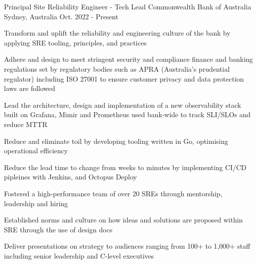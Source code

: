 

\begin{cventries}
  \cventry
    {Principal Site Reliability Engineer - Tech Lead} %
    {Commonwealth Bank of Australia} %
    {Sydney, Australia} %
    {Oct. 2022 - Present} %
    {
      \begin{cvitems} %
      \item {Transform and uplift the reliability and engineering culture of the bank by applying SRE tooling, principles, and practices} 
      \item {Adhere and design to meet stringent security and compliance finance and banking regulations set by regulatory bodies such as APRA (Australia's prudential regulator) including ISO 27001 to ensure customer privacy and data protection laws are followed}
      \item {Lead the architecture, design and implementation of a new observability stack built on Grafana, Mimir and Prometheus used bank-wide to track SLI/SLOs and reduce MTTR}
      \item {Reduce and eliminate toil by developing tooling written in Go, optimising operational efficiency}
      \item {Reduce the lead time to change from weeks to minutes by implementing CI/CD pipleines with Jenkins, and Octopus Deploy}
      \item {Fostered a high-performance team of over 20 SREs through mentorship, leadership and hiring}
      \item {Established norms and culture on how ideas and solutions are proposed within SRE through the use of design docs}
      \item {Deliver presentations on strategy to audiences ranging from 100+ to 1,000+ staff including senior leadership and C-level executives}
      \end{cvitems}
    }



\end{cventries}
